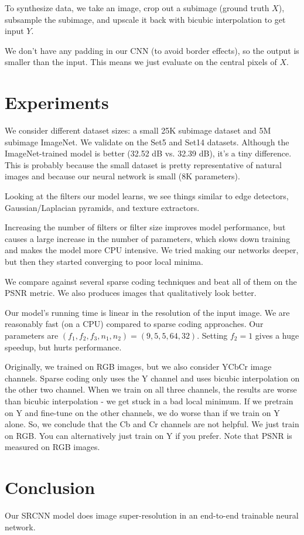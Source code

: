 \documentclass[a4paper]{article}
\begin{document}
To synthesize data, we take an image, crop out a subimage (ground truth $X$),
subsample the subimage, and upscale it back with bicubic interpolation to get
input $Y$.

We don't have any padding in our CNN (to avoid border effects), so the output
is smaller than the input. This means we just evaluate on the central pixels of
$X$.

\section{Experiments}
We consider different dataset sizes: a small 25K subimage dataset and 5M
subimage ImageNet. We validate on the Set5 and Set14 datasets. Although
the ImageNet-trained model is better (32.52 dB vs. 32.39 dB), it's a tiny
difference. This is probably because the small dataset is pretty representative
of natural images and because our neural network is small (8K parameters).

Looking at the filters our model learns, we see things similar to edge
detectors, Gaussian/Laplacian pyramids, and texture extractors.

Increasing the number of filters or filter size improves model performance,
but causes a large increase in the number of parameters, which slows down
training and makes the model more CPU intensive. We tried making our
networks deeper, but then they started converging to poor local minima.

We compare against several sparse coding techniques and beat all of them
on the PSNR metric. We also produces images that qualitatively look better.

Our model's running time is linear in the resolution of the input image. We
are reasonably fast (on a CPU) compared to sparse coding approaches. Our
parameters are $(f_1, f_2, f_3, n_1, n_2) = (9, 5, 5, 64, 32)$. Setting
$f_2 = 1$ gives a huge speedup, but hurts performance.

Originally, we trained on RGB images, but we also consider YCbCr image channels.
Sparse coding only uses the Y channel and
uses bicubic interpolation on the other two channel. When we train on
all three channels, the results are worse than bicubic interpolation - we
get stuck in a bad local minimum. If we pretrain on Y and fine-tune on the
other channels, we do worse than if we train on Y alone. So, we conclude
that the Cb and Cr channels are not helpful. We just train on RGB. You can
alternatively just train on Y if you prefer. Note that PSNR is measured on
RGB images.

\section{Conclusion}
Our SRCNN model does image super-resolution in an end-to-end trainable
neural network.
\end{document}
